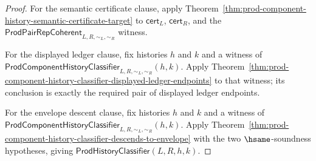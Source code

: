 \begin{proof}
For the semantic certificate clause, apply
Theorem~\ref{thm:prod-component-history-semantic-certificate-target} to
$\mathsf{cert}_L$, $\mathsf{cert}_R$, and the
$\mathsf{ProdPairRepCoherent}_{L,R,\sim_L,\sim_R}$ witness.

For the displayed ledger clause, fix histories $h$ and $k$ and a witness of
$\mathsf{ProdComponentHistoryClassifier}_{L,R,\sim_L,\sim_R}(h,k)$. Apply
Theorem~\ref{thm:prod-component-history-classifier-displayed-ledger-endpoints}
to that witness; its conclusion is exactly the required pair of displayed
ledger endpoints.

For the envelope descent clause, fix histories $h$ and $k$ and a witness of
$\mathsf{ProdComponentHistoryClassifier}_{L,R,\sim_L,\sim_R}(h,k)$. Apply
Theorem~\ref{thm:prod-component-history-classifier-descends-to-envelope} with
the two $\hsame$-soundness hypotheses, giving
$\mathsf{ProdHistoryClassifier}(L,R,h,k)$.
\end{proof}

